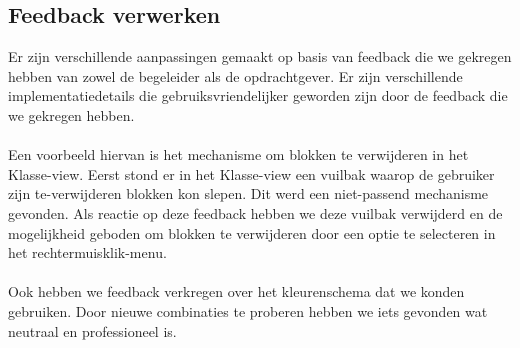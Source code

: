 \documentclass[]{article}
\begin{document}
\subsection{Feedback verwerken}
Er zijn verschillende aanpassingen gemaakt op basis van feedback die we gekregen hebben van zowel de begeleider als de opdrachtgever. Er zijn verschillende implementatiedetails die gebruiksvriendelijker geworden zijn door de feedback die we gekregen hebben. \\\\
Een voorbeeld hiervan is het mechanisme om blokken te verwijderen in het Klasse-view. Eerst stond er in het Klasse-view een vuilbak waarop de gebruiker zijn te-verwijderen blokken kon slepen. Dit werd een niet-passend mechanisme gevonden. Als reactie op deze feedback hebben we deze vuilbak verwijderd en de mogelijkheid geboden om blokken te verwijderen door een optie te selecteren in het rechtermuisklik-menu. \\\\
Ook hebben we feedback verkregen over het kleurenschema dat we konden gebruiken. Door nieuwe combinaties te proberen hebben we iets gevonden wat neutraal en professioneel is.
\end{document}
